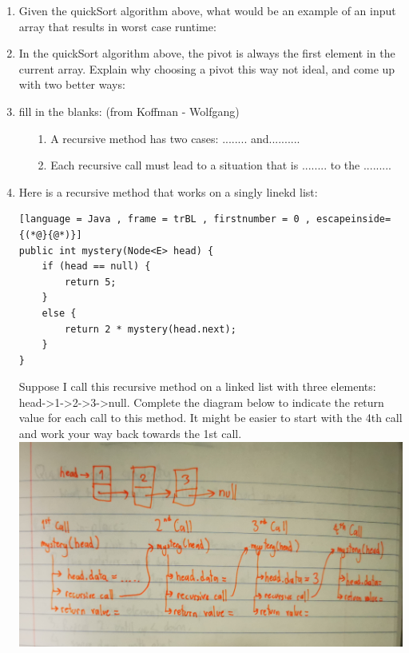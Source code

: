 \documentclass[letter]{article}
\begin{document}
\begin{enumerate}[1.]
\begin{lstlisting}[language = Java , frame = trBL , firstnumber = 0 , escapeinside={(*@}{@*)}]
    return down;
}
\end{lstlisting}

    
     \item Given the quickSort algorithm above, what would be an example of an input array that results in worst case runtime: \\


     \item In the quickSort algorithm above, the pivot is always the first element in the current array. Explain why choosing a pivot this way not ideal, and come up with two better ways:\\



    \item fill in the blanks: (from Koffman - Wolfgang)
    
        \begin{itemize}
            \item [1.] A recursive method has two cases: ........ and..........
            \item [2.] Each recursive call must lead to a situation that is ........ to the .........
        \end{itemize}

    \item Here is a recursive method that works on a singly linekd list:\\

\begin{lstlisting}[language = Java , frame = trBL , firstnumber = 0 , escapeinside={(*@}{@*)}]
public int mystery(Node<E> head) {
    if (head == null) {
        return 5;
    }
    else {
        return 2 * mystery(head.next);
    }
}
\end{lstlisting}

    Suppose I call this recursive method on a linked list with three elements: head->1->2->3->null. Complete the diagram below to indicate the return value for each call to this method. It might be easier to start with the 4th call and work your way back towards the 1st call.\\

\includegraphics[scale = 0.10]{Question.jpg}\\



\end{enumerate}
\end{document}
